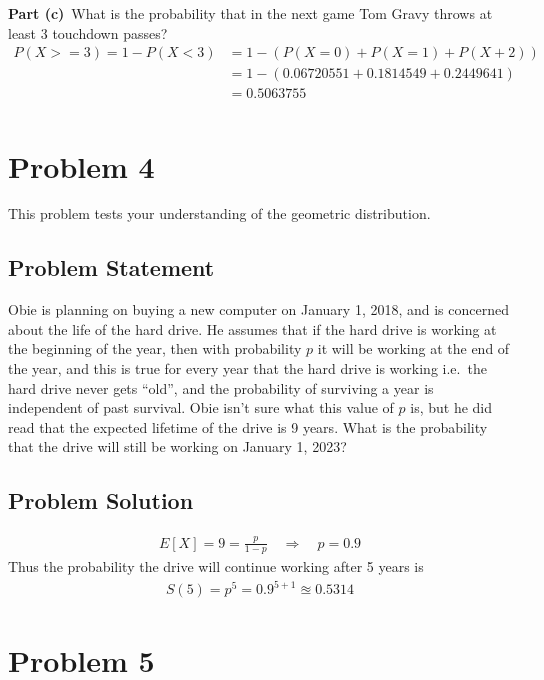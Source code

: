 \documentclass[12pt]{article}
\theoremstyle{definition}
\begin{document}
\vspace{4.5in}
\noindent
{\bf Part (c)}\ What is the probability that in the next game Tom Gravy throws at least 3 touchdown passes?
\begin{align*}
P(X >= 3) = 1 - P(X < 3) &= 1 - (P(X = 0) + P(X = 1) + P(X + 2))\\
&= 1 - (0.06720551 + 0.1814549 + 0.2449641)\\
& = 0.5063755\\
\end{align*}

\newpage
\section*{Problem 4}

This problem tests your understanding of the geometric distribution.

\subsection*{Problem Statement}

Obie is planning on buying a new computer on January 1, 2018, and is concerned about the life of the hard drive. He assumes that if the hard drive is working at the beginning of the year, then with probability $p$ it will be working at the end of the year, and this is true for every year that the hard drive is working i.e.\ the hard drive never gets ``old'', and the probability of surviving a year is independent of past survival. Obie isn't sure what this value of $p$ is, but he did read that the expected lifetime of the drive is 9 years. What is the probability that the drive will still be working on January 1, 2023?


\subsection*{Problem Solution}
\begin{align*}
E[X] = 9 = \frac{p}{1-p} \quad\Rightarrow\quad p = 0.9
\end{align*}
Thus the probability the drive will continue working after 5 years is
\begin{align*}
S(5) = p^5 = 0.9^{5+1} \approxeq  0.5314
\end{align*}

\newpage
\section*{Problem 5}
\end{document}

